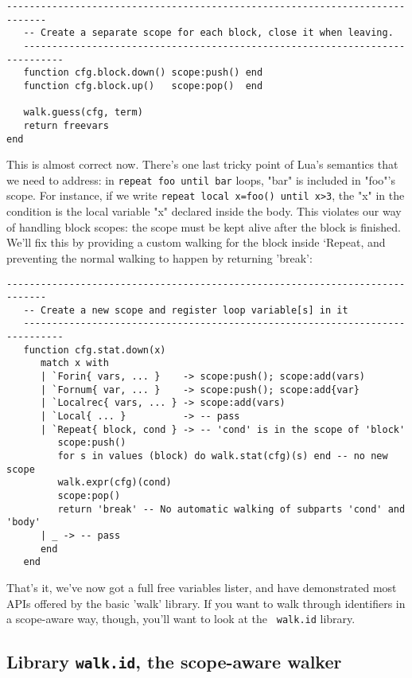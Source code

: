 \begin{Verbatim}[fontsize=\scriptsize]
   -----------------------------------------------------------------------------
   -- Create a separate scope for each block, close it when leaving.
   -----------------------------------------------------------------------------
   function cfg.block.down() scope:push() end
   function cfg.block.up()   scope:pop()  end

   walk.guess(cfg, term)
   return freevars
end
\end{Verbatim}

This is almost correct now. There's one last tricky point of Lua's semantics
that we need to address: in {\tt repeat foo until bar} loops, "bar" is included
in "foo"'s scope. For instance, if we write {\tt repeat local x=foo() until
  x>3}, the "x" in the condition is the local variable "x" declared inside the
body. This violates our way of handling block scopes: the scope must be kept
alive after the block is finished. We'll fix this by providing a custom walking
for the block inside `Repeat, and preventing the normal walking to happen by
returning 'break':

\begin{Verbatim}[fontsize=\scriptsize]
   -----------------------------------------------------------------------------
   -- Create a new scope and register loop variable[s] in it
   -----------------------------------------------------------------------------
   function cfg.stat.down(x)
      match x with
      | `Forin{ vars, ... }    -> scope:push(); scope:add(vars)
      | `Fornum{ var, ... }    -> scope:push(); scope:add{var}
      | `Localrec{ vars, ... } -> scope:add(vars)
      | `Local{ ... }          -> -- pass
      | `Repeat{ block, cond } -> -- 'cond' is in the scope of 'block'
         scope:push()
         for s in values (block) do walk.stat(cfg)(s) end -- no new scope
         walk.expr(cfg)(cond)
         scope:pop()
         return 'break' -- No automatic walking of subparts 'cond' and 'body'
      | _ -> -- pass
      end
   end
\end{Verbatim}

That's it, we've now got a full free variables lister, and have demonstrated
most APIs offered by the basic 'walk' library. If you want to walk through
identifiers in a scope-aware way, though, you'll want to look at the {\tt
  walk.id} library.

\subsection{Library {\tt walk.id}, the scope-aware walker}

